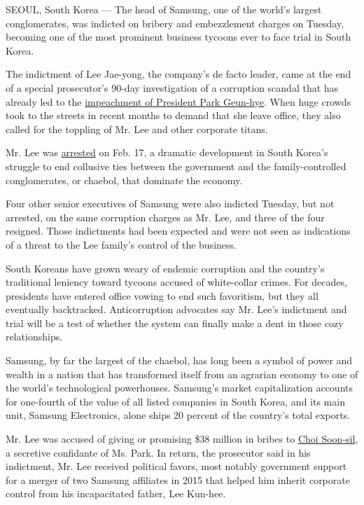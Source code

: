 SEOUL, South Korea --- The head of Samsung, one of the world's largest
conglomerates, was indicted on bribery and embezzlement charges on
Tuesday, becoming one of the most prominent business tycoons ever to
face trial in South Korea.

The indictment of Lee Jae-yong, the company's de facto leader, came at
the end of a special prosecutor's 90-day investigation of a corruption
scandal that has already led to the
\href{https://www.nytimes3xbfgragh.onion/2016/12/08/world/asia/south-korea-park-geun-hye-accusations-impeachment.html}{impeachment
of President Park Geun-hye}. When huge crowds took to the streets in
recent months to demand that she leave office, they also called for the
toppling of Mr. Lee and other corporate titans.

Mr. Lee was
\href{https://www.nytimes3xbfgragh.onion/2017/02/16/world/asia/korea-samsung-lee-jae-yong.html}{arrested}
on Feb. 17, a dramatic development in South Korea's struggle to end
collusive ties between the government and the family-controlled
conglomerates, or chaebol, that dominate the economy.

Four other senior executives of Samsung were also indicted Tuesday, but
not arrested, on the same corruption charges as Mr. Lee, and three of
the four resigned. Those indictments had been expected and were not seen
as indications of a threat to the Lee family's control of the business.

South Koreans have grown weary of endemic corruption and the country's
traditional leniency toward tycoons accused of white-collar crimes. For
decades, presidents have entered office vowing to end such favoritism,
but they all eventually backtracked. Anticorruption advocates say Mr.
Lee's indictment and trial will be a test of whether the system can
finally make a dent in those cozy relationships.

Samsung, by far the largest of the chaebol, has long been a symbol of
power and wealth in a nation that has transformed itself from an
agrarian economy to one of the world's technological powerhouses.
Samsung's market capitalization accounts for one-fourth of the value of
all listed companies in South Korea, and its main unit, Samsung
Electronics, alone ships 20 percent of the country's total exports.

Mr. Lee was accused of giving or promising \$38 million in bribes to
\href{https://www.nytimes3xbfgragh.onion/2016/11/01/world/asia/south-korea-park-geun-hye-choi-soon-sil.html}{Choi
Soon-sil}, a secretive confidante of Ms. Park. In return, the prosecutor
said in his indictment, Mr. Lee received political favors, most notably
government support for a merger of two Samsung affiliates in 2015 that
helped him inherit corporate control from his incapacitated father, Lee
Kun-hee.

